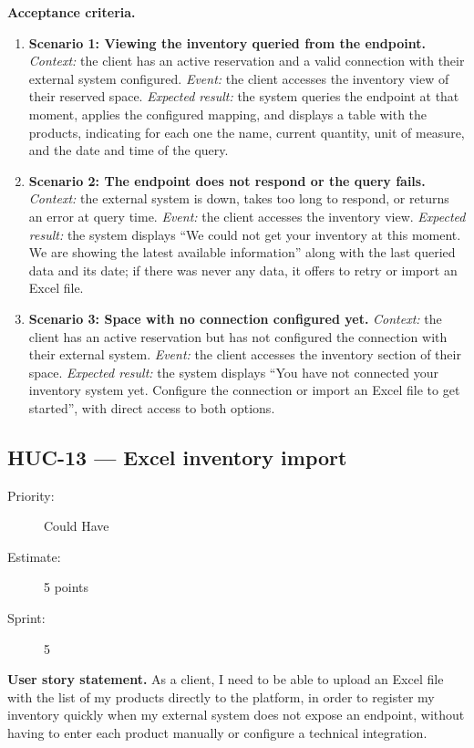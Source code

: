 \documentclass[11pt,a4paper,oneside]{report}
\begin{document}
\textbf{Acceptance criteria.}
\begin{enumerate}
\item \textbf{Scenario 1: Viewing the inventory queried from the endpoint.} \emph{Context:} the client has an active reservation and a valid connection with their external system configured. \emph{Event:} the client accesses the inventory view of their reserved space. \emph{Expected result:} the system queries the endpoint at that moment, applies the configured mapping, and displays a table with the products, indicating for each one the name, current quantity, unit of measure, and the date and time of the query.
\item \textbf{Scenario 2: The endpoint does not respond or the query fails.} \emph{Context:} the external system is down, takes too long to respond, or returns an error at query time. \emph{Event:} the client accesses the inventory view. \emph{Expected result:} the system displays ``We could not get your inventory at this moment. We are showing the latest available information'' along with the last queried data and its date; if there was never any data, it offers to retry or import an Excel file.
\item \textbf{Scenario 3: Space with no connection configured yet.} \emph{Context:} the client has an active reservation but has not configured the connection with their external system. \emph{Event:} the client accesses the inventory section of their space. \emph{Expected result:} the system displays ``You have not connected your inventory system yet. Configure the connection or import an Excel file to get started'', with direct access to both options.
\end{enumerate}

\subsection{HUC-13 --- Excel inventory import}
\label{req:HUC-13}
\begin{description}
\item[Priority:] Could Have \quad \item[Estimate:] 5 points \quad \item[Sprint:] 5
\end{description}

\textbf{User story statement.} As a client, I need to be able to upload an Excel file with the list of my products directly to the platform, in order to register my inventory quickly when my external system does not expose an endpoint, without having to enter each product manually or configure a technical integration.
\end{document}
